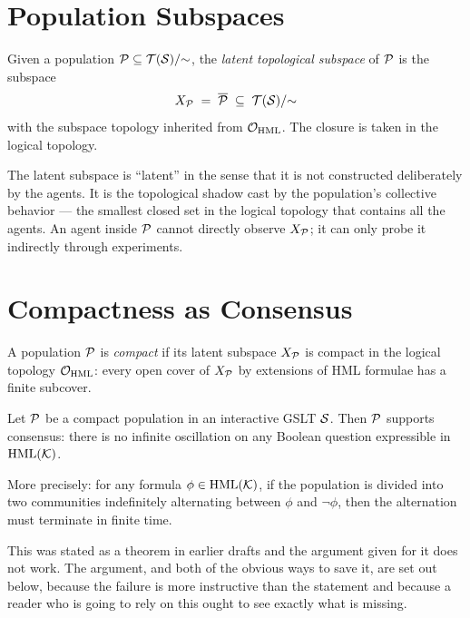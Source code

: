 \section{Population Subspaces}

\begin{definition}
Given a population $\mathcal{P} \subseteq \mathcal{T}(\mathcal{S})/{\sim}$, the
\emph{latent topological subspace} of $\mathcal{P}$ is the subspace
\[
  X_{\mathcal{P}} \;=\; \overline{\mathcal{P}} \;\subseteq\; \mathcal{T}(\mathcal{S})/{\sim}
\]
with the subspace topology inherited from $\mathcal{O}_{\mathrm{HML}}$.
The closure is taken in the logical topology.
\end{definition}

\begin{remark}
The latent subspace is ``latent'' in the sense that it is not
constructed deliberately by the agents.
It is the topological shadow cast by the population's collective
behavior --- the smallest closed set in the logical topology that
contains all the agents.
An agent inside $\mathcal{P}$ cannot directly observe $X_{\mathcal{P}}$;
it can only probe it indirectly through experiments.
\end{remark}

\section{Compactness as Consensus}

\begin{definition}
A population $\mathcal{P}$ is \emph{compact} if its latent subspace
$X_{\mathcal{P}}$ is compact in the logical topology $\mathcal{O}_{\mathrm{HML}}$:
every open cover of $X_{\mathcal{P}}$ by extensions of HML formulae has a
finite subcover.
\end{definition}

\begin{conjecture}
\label{thm:compact-consensus}
Let $\mathcal{P}$ be a compact population in an interactive GSLT $\mathcal{S}$.
Then $\mathcal{P}$ supports consensus: there is no infinite oscillation
on any Boolean question expressible in $\mathrm{HML}(\mathcal{K})$.

More precisely: for any formula $\phi \in \mathrm{HML}(\mathcal{K})$, if the
population is divided into two communities indefinitely alternating
between $\phi$ and $\neg\phi$, then the alternation must terminate
in finite time.
\end{conjecture}

This was stated as a theorem in earlier drafts and the argument given
for it does not work.
The argument, and both of the obvious ways to save it, are set out
below, because the failure is more instructive than the statement and
because a reader who is going to rely on this ought to see exactly what
is missing.


